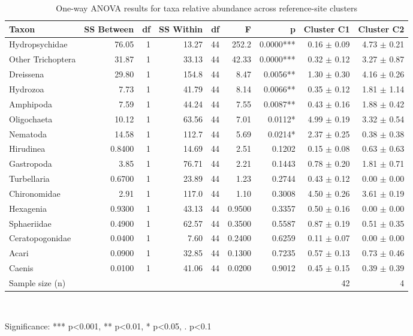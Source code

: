 \begin{table}[htbp]
  \centering
  \caption{One-way ANOVA results for taxa relative abundance across reference-site clusters}
  \label{tab:02_taxa_assemblage_anova_taxa}
  \small
  \begin{tabular}{lrrrrrrrr}
    \toprule
    Taxon & SS Between & df & SS Within & df  & F & p & Cluster C1 & Cluster C2 \\
    \midrule
    Hydropsychidae & 76.05 & 1 & 13.27 & 44 & 252.2 & 0.0000*** & 0.16 $\pm$ 0.09 & 4.73 $\pm$ 0.21 \\
    Other Trichoptera & 31.87 & 1 & 33.13 & 44 & 42.33 & 0.0000*** & 0.32 $\pm$ 0.12 & 3.27 $\pm$ 0.87 \\
    Dreissena & 29.80 & 1 & 154.8 & 44 & 8.47 & 0.0056** & 1.30 $\pm$ 0.30 & 4.16 $\pm$ 0.26 \\
    Hydrozoa & 7.73 & 1 & 41.79 & 44 & 8.14 & 0.0066** & 0.35 $\pm$ 0.12 & 1.81 $\pm$ 1.14 \\
    Amphipoda & 7.59 & 1 & 44.24 & 44 & 7.55 & 0.0087** & 0.43 $\pm$ 0.16 & 1.88 $\pm$ 0.42 \\
    Oligochaeta & 10.12 & 1 & 63.56 & 44 & 7.01 & 0.0112* & 4.99 $\pm$ 0.19 & 3.32 $\pm$ 0.54 \\
    Nematoda & 14.58 & 1 & 112.7 & 44 & 5.69 & 0.0214* & 2.37 $\pm$ 0.25 & 0.38 $\pm$ 0.38 \\
    Hirudinea & 0.8400 & 1 & 14.69 & 44 & 2.51 & 0.1202 & 0.15 $\pm$ 0.08 & 0.63 $\pm$ 0.63 \\
    Gastropoda & 3.85 & 1 & 76.71 & 44 & 2.21 & 0.1443 & 0.78 $\pm$ 0.20 & 1.81 $\pm$ 0.71 \\
    Turbellaria & 0.6700 & 1 & 23.89 & 44 & 1.23 & 0.2744 & 0.43 $\pm$ 0.12 & 0.00 $\pm$ 0.00 \\
    Chironomidae & 2.91 & 1 & 117.0 & 44 & 1.10 & 0.3008 & 4.50 $\pm$ 0.26 & 3.61 $\pm$ 0.19 \\
    Hexagenia & 0.9300 & 1 & 43.13 & 44 & 0.9500 & 0.3357 & 0.50 $\pm$ 0.16 & 0.00 $\pm$ 0.00 \\
    Sphaeriidae & 0.4900 & 1 & 62.57 & 44 & 0.3500 & 0.5587 & 0.87 $\pm$ 0.19 & 0.51 $\pm$ 0.35 \\
    Ceratopogonidae & 0.0400 & 1 & 7.60 & 44 & 0.2400 & 0.6259 & 0.11 $\pm$ 0.07 & 0.00 $\pm$ 0.00 \\
    Acari & 0.0900 & 1 & 32.85 & 44 & 0.1300 & 0.7235 & 0.57 $\pm$ 0.13 & 0.73 $\pm$ 0.46 \\
    Caenis & 0.0100 & 1 & 41.06 & 44 & 0.0200 & 0.9012 & 0.45 $\pm$ 0.15 & 0.39 $\pm$ 0.39 \\
    Sample size (n) &  &  &  &  &  &  & 42 & 4 \\
    \bottomrule
  \end{tabular}
  \\[4pt]
  \parbox{\textwidth}{\footnotesize Significance: *** p<0.001, ** p<0.01, * p<0.05, . p<0.1}
\end{table}
